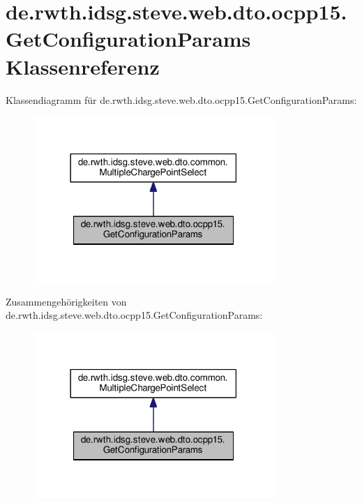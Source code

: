 \hypertarget{classde_1_1rwth_1_1idsg_1_1steve_1_1web_1_1dto_1_1ocpp15_1_1_get_configuration_params}{\section{de.\+rwth.\+idsg.\+steve.\+web.\+dto.\+ocpp15.\+Get\+Configuration\+Params Klassenreferenz}
\label{classde_1_1rwth_1_1idsg_1_1steve_1_1web_1_1dto_1_1ocpp15_1_1_get_configuration_params}
}


Klassendiagramm für de.\+rwth.\+idsg.\+steve.\+web.\+dto.\+ocpp15.\+Get\+Configuration\+Params\+:\nopagebreak
\begin{figure}[H]
\begin{center}
\leavevmode
\includegraphics[width=258pt]{classde_1_1rwth_1_1idsg_1_1steve_1_1web_1_1dto_1_1ocpp15_1_1_get_configuration_params__inherit__graph}
\end{center}
\end{figure}


Zusammengehörigkeiten von de.\+rwth.\+idsg.\+steve.\+web.\+dto.\+ocpp15.\+Get\+Configuration\+Params\+:\nopagebreak
\begin{figure}[H]
\begin{center}
\leavevmode
\includegraphics[width=258pt]{classde_1_1rwth_1_1idsg_1_1steve_1_1web_1_1dto_1_1ocpp15_1_1_get_configuration_params__coll__graph}
\end{center}
\end{figure}
